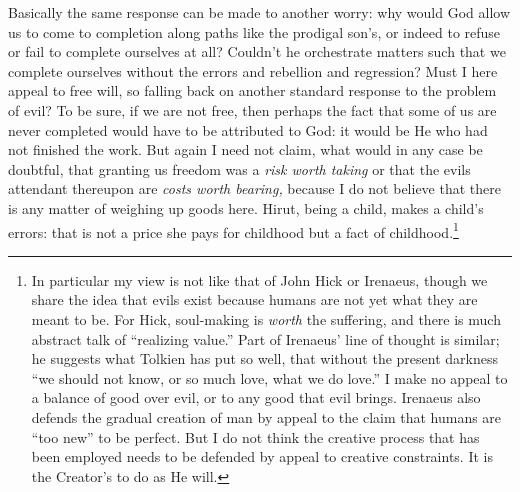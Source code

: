 \documentclass[11pt]{amsart}
\begin{document}
Basically the same response can be made to another worry: why would God allow us to come to completion along paths like the prodigal son's, or indeed to refuse or fail to complete ourselves at all? Couldn't he orchestrate matters such that we complete ourselves without the errors and rebellion and regression? Must I here appeal to free will, so falling back on another standard response to the problem of evil? To be sure, if we are not free, then perhaps the fact that some of us are never completed would have to be attributed to God: it would be He who had not finished the work. But again I need not claim, what would in any case be doubtful, that granting us freedom was a \emph{risk worth taking} or that the evils attendant thereupon are \emph{costs worth bearing,} because I do not believe that there is any matter of weighing up goods here. Hirut, being a child, makes a child's errors: that is not a price she pays for childhood but a fact of childhood.\footnote{In particular my view is not like that of John Hick or Irenaeus, though we share the idea that evils exist because humans are not yet what they are meant to be. For Hick, soul-making is \emph{worth} the suffering, and there is much abstract talk of ``realizing value.'' Part of Irenaeus' line of thought is similar; he suggests what Tolkien has put so well, that without the present darkness ``we should not know, or so much love, what we do love.'' I make no appeal to a balance of good over evil, or to any good that evil brings. Irenaeus also defends the gradual creation of man by appeal to the claim that humans are ``too new'' to be perfect. But I do not think the creative process that has been employed needs to be defended by appeal to creative constraints. It is the Creator's to do as He will.}

\end{document}
